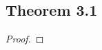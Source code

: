 \documentclass[../../main.tex]{subfiles}
\begin{document}
\subsection{Theorem 3.1}
\begin{wts}

\end{wts}
\begin{proof}

\end{proof}
\end{document}
